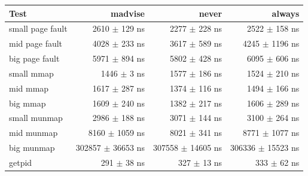 \begin{tabular}{@{}lrrr@{}}
\toprule
Test & madvise & never & always \\
\midrule
small page fault & 2610 $\pm$ 129 ns & 2277 $\pm$ 228 ns & 2522 $\pm$ 158 ns \\
mid page fault & 4028 $\pm$ 233 ns & 3617 $\pm$ 589 ns & 4245 $\pm$ 1196 ns \\
big page fault & 5971 $\pm$ 894 ns & 5802 $\pm$ 428 ns & 6095 $\pm$ 606 ns \\
small mmap & 1446 $\pm$ 3 ns & 1577 $\pm$ 186 ns & 1524 $\pm$ 210 ns \\
mid mmap & 1617 $\pm$ 287 ns & 1374 $\pm$ 116 ns & 1494 $\pm$ 166 ns \\
big mmap & 1609 $\pm$ 240 ns & 1382 $\pm$ 217 ns & 1606 $\pm$ 289 ns \\
small munmap & 2986 $\pm$ 188 ns & 3071 $\pm$ 144 ns & 3100 $\pm$ 264 ns \\
mid munmap & 8160 $\pm$ 1059 ns & 8021 $\pm$ 341 ns & 8771 $\pm$ 1077 ns \\
big munmap & 302857 $\pm$ 36653 ns & 307558 $\pm$ 14605 ns & 306336 $\pm$ 15523 ns \\
getpid & 291 $\pm$ 38 ns & 327 $\pm$ 13 ns & 333 $\pm$ 62 ns \\
\bottomrule
\end{tabular}
